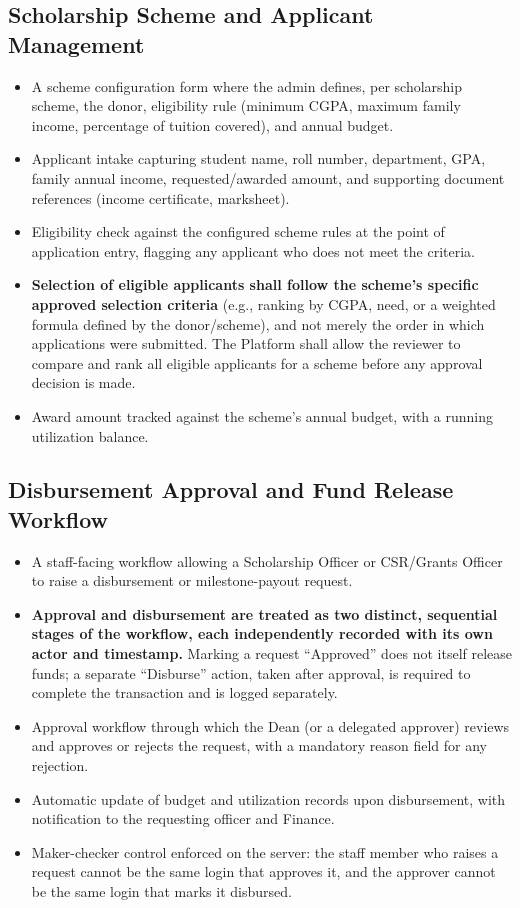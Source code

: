 \documentclass[11pt]{article}
\begin{document}
\subsection{Scholarship Scheme and Applicant Management}
\begin{itemize}[leftmargin=1.4em, itemsep=3pt]
\item A scheme configuration form where the admin defines, per scholarship scheme, the donor, eligibility rule (minimum CGPA, maximum family income, percentage of tuition covered), and annual budget.
\item Applicant intake capturing student name, roll number, department, GPA, family annual income, requested/awarded amount, and supporting document references (income certificate, marksheet).
\item Eligibility check against the configured scheme rules at the point of application entry, flagging any applicant who does not meet the criteria.
\item \textbf{Selection of eligible applicants shall follow the scheme's specific approved selection criteria} (e.g., ranking by CGPA, need, or a weighted formula defined by the donor/scheme), and not merely the order in which applications were submitted. The Platform shall allow the reviewer to compare and rank all eligible applicants for a scheme before any approval decision is made.
\item Award amount tracked against the scheme's annual budget, with a running utilization balance.
\end{itemize}

\subsection{Disbursement Approval and Fund Release Workflow}
\begin{itemize}[leftmargin=1.4em, itemsep=3pt]
\item A staff-facing workflow allowing a Scholarship Officer or CSR/Grants Officer to raise a disbursement or milestone-payout request.
\item \textbf{Approval and disbursement are treated as two distinct, sequential stages of the workflow, each independently recorded with its own actor and timestamp.} Marking a request ``Approved'' does not itself release funds; a separate ``Disburse'' action, taken after approval, is required to complete the transaction and is logged separately.
\item Approval workflow through which the Dean (or a delegated approver) reviews and approves or rejects the request, with a mandatory reason field for any rejection.
\item Automatic update of budget and utilization records upon disbursement, with notification to the requesting officer and Finance.
\item Maker-checker control enforced on the server: the staff member who raises a request cannot be the same login that approves it, and the approver cannot be the same login that marks it disbursed.
\end{itemize}
\end{document}
